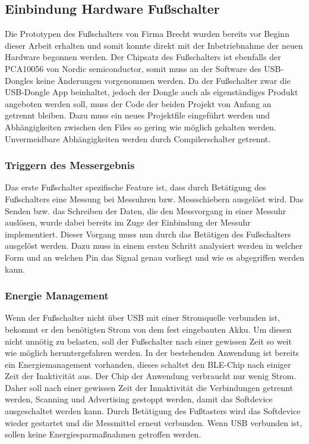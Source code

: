 \subsection{Einbindung Hardware Fußschalter}
Die Prototypen des Fußschalters von Firma Brecht wurden bereits vor Beginn dieser Arbeit erhalten und somit konnte direkt mit der Inbetriebnahme der neuen Hardware begonnen werden. Der Chipsatz des Fußschalters ist ebenfalls der PCA10056 von Nordic semiconductor, somit muss an der Software des USB-Dongles keine Änderungen vorgenommen werden. Da der Fußschalter zwar die USB-Dongle App beinhaltet, jedoch der Dongle auch als eigenständiges Produkt angeboten werden soll, muss der Code der beiden Projekt von Anfang an getrennt bleiben. Dazu muss ein neues Projektfile eingeführt werden und Abhängigkeiten zwischen den Files so gering wie möglich gehalten werden. Unvermeidbare Abhängigkeiten werden durch Compilerschalter getrennt. 

\subsubsection{Triggern des Messergebnis}
Das erste Fußschalter spezifische Feature ist, dass durch Betätigung des Fußschalters eine Messung bei Messuhren bzw. Messschiebern ausgelöst wird. Das Senden bzw. das Schreiben der Daten, die den Messvorgang in einer Messuhr auslösen, wurde dabei bereits im Zuge der Einbindung der Messuhr implementiert. Dieser Vorgang muss nun durch das Betätigen des Fußschalters ausgelöst werden. Dazu muss in einem ersten Schritt analysiert werden in welcher Form und an welchen Pin das Signal genau vorliegt und wie es abgegriffen werden kann.  

\subsubsection{Energie Management}
Wenn der Fußschalter nicht über USB mit einer Stromquelle verbunden ist, bekommt er den benötigten Strom von dem fest eingebauten Akku. Um diesen nicht unnötig zu belasten, soll der Fußschalter nach einer gewissen Zeit so weit wie möglich heruntergefahren werden.  
In der bestehenden Anwendung ist bereits ein Energiemanagement vorhanden, dieses schaltet den BLE-Chip nach einiger Zeit der Inaktivität aus. Der Chip der Anwendung verbraucht nur wenig Strom. Daher soll nach einer gewissen Zeit der Innaktivität die Verbindungen getrennt werden, Scanning und Advertising gestoppt werden, damit das Softdevice ausgeschaltet werden kann. Durch Betätigung des Fußtasters wird das Softdevice wieder gestartet und die Messmittel erneut verbunden. Wenn USB verbunden ist, sollen keine Energiesparmaßnahmen getroffen werden. 

